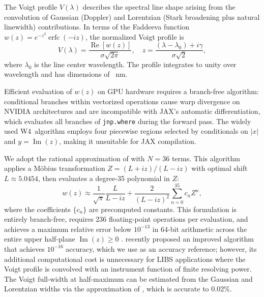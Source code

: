 \documentclass[preprint,12pt,authoryear]{elsarticle}
\begin{document}
The Voigt profile $V(\lambda)$ describes the spectral line shape arising from the convolution of Gaussian (Doppler) and Lorentzian (Stark broadening plus natural linewidth) contributions.
In terms of the Faddeeva function $w(z) = e^{-z^2} \operatorname{erfc}(-iz)$, the normalized Voigt profile is
\begin{equation}
  V(\lambda) = \frac{\operatorname{Re}[w(z)]}{\sigma \sqrt{2\pi}}, \quad
  z = \frac{(\lambda - \lambda_0) + i\gamma}{\sigma\sqrt{2}},
  \label{eq:voigt}
\end{equation}
where $\lambda_0$ is the line center wavelength.
The profile integrates to unity over wavelength and has dimensions of \si{\per\nano\metre}.

Efficient evaluation of $w(z)$ on GPU hardware requires a branch-free algorithm: conditional branches within vectorized operations cause warp divergence on NVIDIA architectures and are incompatible with JAX's automatic differentiation, which evaluates all branches of \texttt{jnp.where} during the forward pass.
The widely used \citet{Humlicek1982} W4~algorithm employs four piecewise regions selected by conditionals on $|x|$ and $y = \operatorname{Im}(z)$, making it unsuitable for JAX compilation.

We adopt the rational approximation of \citet{Weideman1994} with $N = 36$ terms.
This algorithm applies a M\"obius transformation $Z = (L + iz)/(L - iz)$ with optimal shift $L \approx 5.0454$, then evaluates a degree-35 polynomial in $Z$:
\begin{equation}
  w(z) \approx \frac{1}{\sqrt{\pi}} \frac{L}{L - iz}
    + \frac{2}{(L - iz)^2} \sum_{n=0}^{35} c_n Z^n,
  \label{eq:weideman}
\end{equation}
where the coefficients $\{c_n\}$ are precomputed constants.
This formulation is entirely branch-free, requires 236 floating-point operations per evaluation, and achieves a maximum relative error below $10^{-13}$ in 64-bit arithmetic across the entire upper half-plane $\operatorname{Im}(z) \geq 0$ \citep{Weideman1994}.
\citet{Zaghloul2024} recently proposed an improved algorithm that achieves $10^{-16}$ accuracy, which we use as an accuracy reference; however, its additional computational cost is unnecessary for LIBS applications where the Voigt profile is convolved with an instrument function of finite resolving power.
The Voigt full-width at half-maximum can be estimated from the Gaussian and Lorentzian widths via the approximation of \citet{Olivero1977}, which is accurate to 0.02\%.
\end{document}

